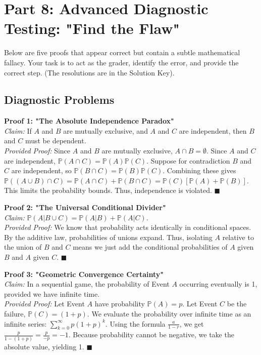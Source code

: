 \documentclass[12pt]{article}
\theoremstyle{definition}
\theoremstyle{remark}
\begin{document}
\newpage
\section{Part 8: Advanced Diagnostic Testing: "Find the Flaw"}

Below are five proofs that appear correct but contain a subtle mathematical fallacy. Your task is to act as the grader, identify the error, and provide the correct step. (The resolutions are in the Solution Key).

\subsection{Diagnostic Problems}

\textbf{Proof 1: "The Absolute Independence Paradox"} \\
\textit{Claim:} If $A$ and $B$ are mutually exclusive, and $A$ and $C$ are independent, then $B$ and $C$ must be dependent. \\
\textit{Provided Proof:} Since $A$ and $B$ are mutually exclusive, $A \cap B = \emptyset$. Since $A$ and $C$ are independent, $\mathbb{P}(A \cap C) = \mathbb{P}(A)\mathbb{P}(C)$. Suppose for contradiction $B$ and $C$ are independent, so $\mathbb{P}(B \cap C) = \mathbb{P}(B)\mathbb{P}(C)$. Combining these gives $\mathbb{P}((A \cup B) \cap C) = \mathbb{P}(A \cap C) + \mathbb{P}(B \cap C) = \mathbb{P}(C)[\mathbb{P}(A) + \mathbb{P}(B)]$. This limits the probability bounds. Thus, independence is violated. $\blacksquare$

\textbf{Proof 2: "The Universal Conditional Divider"} \\
\textit{Claim:} $\mathbb{P}(A | B \cup C) = \mathbb{P}(A | B) + \mathbb{P}(A | C)$. \\
\textit{Provided Proof:} We know that probability acts identically in conditional spaces. By the additive law, probabilities of unions expand. Thus, isolating $A$ relative to the union of $B$ and $C$ means we just add the conditional probabilities of $A$ given $B$ and $A$ given $C$. $\blacksquare$

\textbf{Proof 3: "Geometric Convergence Certainty"} \\
\textit{Claim:} In a sequential game, the probability of Event $A$ occurring eventually is 1, provided we have infinite time. \\
\textit{Provided Proof:} Let Event $A$ have probability $\mathbb{P}(A) = p$. Let Event $C$ be the failure, $\mathbb{P}(C) = (1+p)$. We evaluate the probability over infinite time as an infinite series: $\sum_{k=0}^\infty p (1+p)^k$. Using the formula $\frac{a}{1-r}$, we get $\frac{p}{1-(1+p)} = \frac{p}{-p} = -1$. Because probability cannot be negative, we take the absolute value, yielding 1. $\blacksquare$
\end{document}
